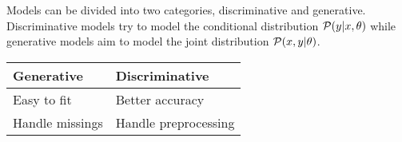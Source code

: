 \documentclass[../../main.tex]{subfiles}
\begin{document}
Models can be divided into two categories, discriminative and generative. Discriminative models try to model the conditional distribution $\mathcal{P}(y|x,\theta)$ while generative models aim to model the joint distribution $\mathcal{P}(x,y|\theta)$.
\begin{table}[H]
    \centering
    \begin{tabular}{|p{}|p{}|}
        \hline
        Generative & Discriminative\\
        \hline
        \hline
        Easy to fit & Better accuracy\\
        \hline
        Handle missings & Handle preprocessing\\
        \hline
    \end{tabular}
\end{table}
\end{document}
